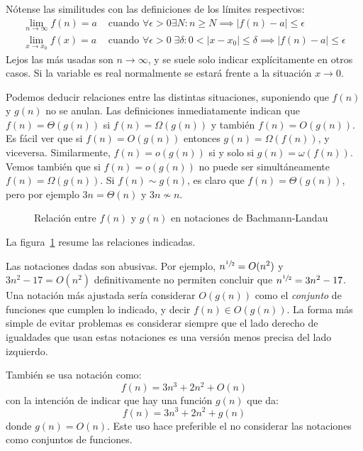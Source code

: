   Nótense las similitudes
  con las definiciones de los límites respectivos:%
  \begin{align*}
    \lim_{n \rightarrow \infty} f(n) = a
       &\text{\ cuando\ }
	 \forall \epsilon > 0 \exists N \colon
	   n \ge N \implies \lvert f(n) - a \rvert \le \epsilon \\
    \lim_{x \rightarrow x_0} f(x) = a
       &\text{\ cuando\ }
	 \forall \epsilon > 0 \; \exists \delta \colon
	   0 < \lvert x - x_0 \rvert \le \delta
	      \implies \lvert f(n) - a \rvert \le \epsilon
  \end{align*}
  Lejos las más usadas son \(n \rightarrow \infty\),
  y se suele solo indicar explícitamente en otros casos.
  Si la variable es real
  normalmente se estará frente a la situación \(x \rightarrow 0\).

  Podemos deducir relaciones entre las distintas situaciones,
  suponiendo que \(f(n)\) y \(g(n)\) no se anulan.
  Las definiciones
  inmediatamente indican que \(f(n) = \Theta(g(n))\)
  si \(f(n) = \Omega(g(n))\) y también \(f(n) = O(g(n))\).
  Es fácil ver que si \(f(n) = O(g(n))\)
  entonces \(g(n) = \Omega(f(n))\),
  y viceversa.
  Similarmente,
  \(f(n) = o(g(n))\) si y solo si \(g(n) = \omega(f(n))\).
  Vemos también que si \(f(n) = o(g(n))\)
  no puede ser simultáneamente \(f(n) = \Omega(g(n))\).
  Si \(f(n) \sim g(n)\),
  es claro que \(f(n) = \Theta(g(n))\),
  pero por ejemplo \(3 n = \Theta(n)\)
  y \(3 n \not\sim n\).
  \begin{figure}[ht]
    \centering
    \caption{Relación entre $f(n)$ y $g(n)$
	     en notaciones de Bachmann-Landau}
    \label{fig:Bachmann-Landau}
  \end{figure}
  La figura~\ref{fig:Bachmann-Landau}
  resume las relaciones indicadas.

  Las notaciones dadas
  son abusivas.
  Por ejemplo,
  \(n^{\sfrac{1}{2}} = O(n^2)\) y \(3 n^2 - 17 = O(n^2)\)
  definitivamente no permiten concluir
  que \(n^{\sfrac{1}{2}} = 3 n^2 - 17\).
  Una notación más ajustada
  sería considerar \(O(g(n))\) como el \emph{conjunto} de funciones
  que cumplen lo indicado,
  y decir \(f(n) \in O(g(n))\).
  La forma más simple de evitar problemas
  es considerar siempre que el lado derecho de igualdades
  que usan estas notaciones
  es una versión menos precisa del lado izquierdo.

  También se usa notación como:
  \begin{equation*}
    f(n) = 3 n^3 + 2 n^2 + O(n)
  \end{equation*}
  con la intención de indicar que hay una función \(g(n)\)
  que da:
  \begin{equation*}
    f(n) = 3 n^3 + 2 n^2 + g(n)
  \end{equation*}
  donde \(g(n) = O(n)\).
  Este uso hace preferible el no considerar las notaciones
  como conjuntos de funciones.

